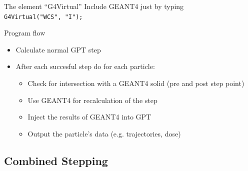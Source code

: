 \documentclass{beamer}
\newcommand{\ident}{\thesection.\thesubsection}
\newcommand{\mysubsection}[1]{\subsection{#1}\label{\ident}}
\newcommand{\ftitle}{\frametitle{\nameref{\ident}}}
\newcommand{\geant}{G{\smaller EANT}4 }
\begin{document}
\begin{frame}
	\ftitle
	\begin{block}{The element ``G4Virtual''}
		Include \geant just by typing\\
		\texttt{G4Virtual("WCS", "I");}
	\end{block}
	\pause
	\begin{exampleblock}{Program flow}
		\begin{itemize}
			\item Calculate normal GPT step
			\item After each succesful step do for each particle:
				\begin{itemize}
					\item Check for intersection with a \geant solid (pre and post step point)
					\item Use \geant for recalculation of the step
					\item Inject the results of \geant into GPT
					\item Output the particle's data (e.g. trajectories, dose)
				\end{itemize}
		\end{itemize}
	\end{exampleblock}
\end{frame}


\mysubsection{Combined Stepping}
\end{document}

